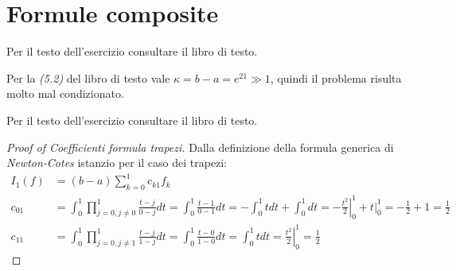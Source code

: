 \section{Formule composite} 

\begin{exercise}[5.1] 
Per il testo dell'esercizio consultare il libro di testo.
\end{exercise}
Per la \emph{(5.2)} del libro di testo vale $\kappa = b-a = e^{21} \gg 1$,
quindi il problema risulta molto mal condizionato.

\begin{exercise}[5.2] 
Per il testo dell'esercizio consultare il libro di testo.
\end{exercise}
\begin{proof}[Proof of Coefficienti formula trapezi]
Dalla definizione della formula generica di \emph{Newton-Cotes} istanzio per il
caso dei trapezi:
\begin{displaymath}
\begin{split}
I_{1}(f) &= (b-a) \sum_{k = 0}^{1}{c_{k1}f_{k}} \\
c_{01} &= \int_{0}^{1}{\prod_{j=0,j\not = 0}^{1}{\frac{t-j}{0-j} dt}} = 
\int_{0}^{1}{\frac{t-1}{0-1}dt} = -\int_{0}^{1}{t dt} +
\int_{0}^{1}{dt} = -\left .\frac{t^{2}}{2}\right |_{0}^{1} + \left .t\right |_{0}^{1} =
-\frac{1}{2} + 1 =
 \frac{1}{2} \\
 c_{11} &= \int_{0}^{1}{\prod_{j=0,j\not = 1}^{1}{\frac{t-j}{1-j} dt}} = 
\int_{0}^{1}{\frac{t-0}{1-0}dt} = \int_{0}^{1}{t dt} = \left
.\frac{t^{2}}{2}\right |_{0}^{1} = \frac{1}{2} 
\end{split}
\end{displaymath}
\end{proof}
